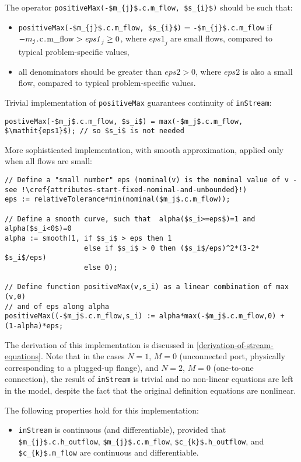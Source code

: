 \begin{nonnormative}
The operator
\lstinline!positiveMax(-$m_{j}$.c.m_flow, $s_{i}$)!
should be such that:
\begin{itemize}
\item
  \lstinline!positiveMax(-$m_{j}$.c.m_flow, $s_{i}$)! =
  \lstinline!-$m_{j}$.c.m_flow! if
  $-m_{j}\text{\lstinline!.c.m_flow!} > \mathit{eps1}_{j} \geq 0$,
  where $\mathit{eps1}_{j}$ are small flows, compared to typical
  problem-specific values,
\item
  all denominators should be greater than $\mathit{eps2} > 0$,
  where $\mathit{eps2}$ is also a small flow, compared to typical problem-specific
  values.
\end{itemize}

Trivial implementation of \lstinline!positiveMax! guarantees continuity of \lstinline!inStream!:
\begin{lstlisting}[language=modelica]
postiveMax(-$m_j$.c.m_flow, $s_i$) = max(-$m_j$.c.m_flow, $\mathit{eps1}$); // so $s_i$ is not needed
\end{lstlisting}
More sophisticated implementation, with smooth approximation, applied only when {all} flows are small:
\begin{lstlisting}[language=modelica,escapechar=!]
// Define a "small number" eps (nominal(v) is the nominal value of v - see !\cref{attributes-start-fixed-nominal-and-unbounded}!)
eps := relativeTolerance*min(nominal($m_j$.c.m_flow));

// Define a smooth curve, such that  alpha($s_i>=eps$)=1 and alpha($s_i<0$)=0
alpha := smooth(1, if $s_i$ > eps then 1
                   else if $s_i$ > 0 then ($s_i$/eps)^2*(3-2* $s_i$/eps)
                   else 0);

// Define function positiveMax(v,s_i) as a linear combination of max (v,0)
// and of eps along alpha
positiveMax((-$m_j$.c.m_flow,s_i) := alpha*max(-$m_j$.c.m_flow,0) + (1-alpha)*eps;
\end{lstlisting}

The derivation of this implementation is discussed in
\cref{derivation-of-stream-equations}. Note that in the cases $N = 1,\, M = 0$ (unconnected port,
physically corresponding to a plugged-up flange), and $N = 2,\,  M = 0$
(one-to-one connection), the result of \lstinline!inStream! is trivial
and no non-linear equations are left in the model, despite the fact that
the original definition equations are nonlinear.

The following properties hold for this implementation:
\begin{itemize}
\item
  \lstinline!inStream! is continuous (and differentiable),
  provided that \lstinline!$m_{j}$.c.h_outflow!,
  \lstinline!$m_{j}$.c.m_flow!, \lstinline!$c_{k}$.h_outflow!, and
  \lstinline!$c_{k}$.m_flow! are continuous and differentiable.
\end{itemize}


\end{nonnormative}
